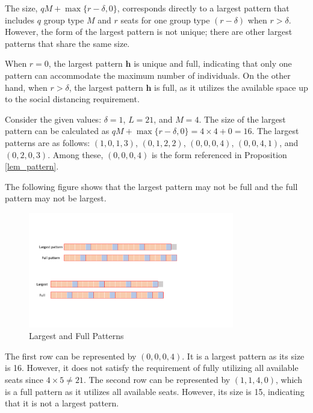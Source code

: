 The size, $qM + \max\{r-\delta, 0\}$, corresponds directly to a largest pattern that includes $q$ group type $M$ and $r$ seats for one group type $(r-\delta)$ when $r>\delta$. However, the form of the largest pattern is not unique; there are other largest patterns that share the same size.


When $r = 0$, the largest pattern $\bm{h}$ is unique and full, indicating that only one pattern can accommodate the maximum number of individuals. On the other hand, when $r > \delta$, the largest pattern $\bm{h}$ is full, as it utilizes the available space up to the social distancing requirement.

\begin{example}
Consider the given values: $\delta = 1$, $L = 21$, and $M = 4$. The size of the largest pattern can be calculated as $qM + \max\{r-\delta, 0\} = 4 \times 4 + 0 = 16$. The largest patterns are as follows: $(1, 0, 1, 3)$, $(0, 1, 2, 2)$, $(0, 0, 0, 4)$, $(0, 0, 4, 1)$, and $(0, 2, 0, 3)$. Among these, $(0, 0, 0, 4)$ is the form referenced in Proposition \ref{lem_pattern}.

The following figure shows that the largest pattern may not be full and the full pattern may not be largest.
\begin{figure}[ht]
    \centering
        \includegraphics[width=0.8\textwidth]{./Figures/full.pdf}
    \caption{Largest and Full Patterns}
\end{figure}

The first row can be represented by $(0, 0, 0, 4)$. It is a largest pattern as its size is 16. However, it does not satisfy the requirement of fully utilizing all available seats since $4 \times 5 \neq 21$. The second row can be represented by $(1, 1, 4, 0)$, which is a full pattern as it utilizes all available seats. However, its size is 15, indicating that it is not a largest pattern.
\end{example}

